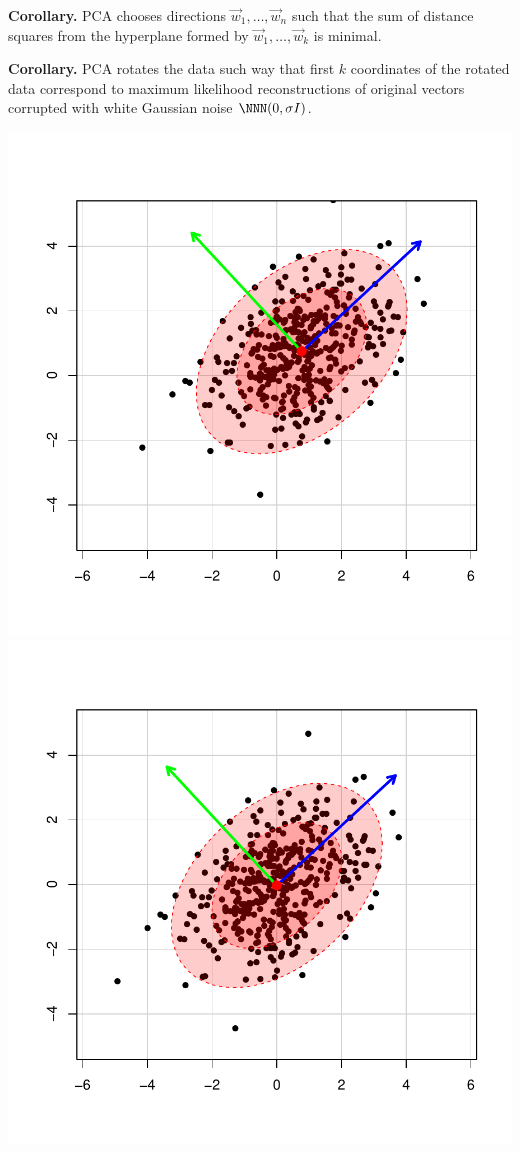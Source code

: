 \documentclass[landscape,footrule]{foils}
\begin{document}
\textbf{Corollary.} PCA chooses directions $\vec{w}_1,\ldots,\vec{w}_n$ such that the sum of distance squares from the hyperplane formed by $\vec{w}_1,\ldots,\vec{w}_k$ is minimal. 


\textbf{Corollary.} PCA rotates the data such way that first $k$ coordinates of the rotated data correspond to maximum likelihood reconstructions of original vectors corrupted with white Gaussian noise $\NNN(0,\sigma I)$.  


\begin{center}
\includegraphics[scale=0.45]{initial-distribution-ii.pdf}
\includegraphics[scale=0.45]{translated-distribution-ii.pdf}

\end{center}
\end{document}
